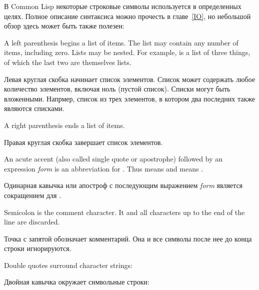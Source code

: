 В Common Lisp некоторые строковые символы используется в определенных целях. Полное
описание синтаксиса можно прочесть в главе~\ref{IO}, но небольшой обзор здесь
может быть также полезен:
\begin{indentdesc}{1.2pc}
\item[\cd{(}]
A left parenthesis begins a list of items.  The list may
contain any number of items, including zero.  Lists may be nested.
For example,  is a list of three things,
of which the last two are themselves lists.

\item[\cd{(}]
Левая круглая скобка начинает список элементов. Список может содержать любое
количество элементов, включая ноль (пустой список). Списки могут быть
вложенными. Напрмер,  список из трех элементов, в
котором два последних также являются списками.

\item[\cd{)}] A right parenthesis ends a list of items.

\item[\cd{)}] Правая круглая скобка завершает список элементов.

\item[\cd{\Xquote}] An acute accent (also called single
quote or apostrophe) followed by an expression {\it form}
is an abbreviation for .  Thus  means
 and  means .

\item[\cd{\Xquote}] Одинарная кавычка или апостроф с последующим выражением {\it
form} является сокращением для . 

\item[\cd{;}] Semicolon is the comment character.  It and all
characters up to the end of the line are discarded.

\item[\cd{;}] Точка с запятой обозначает комментарий. Она и все символы после
нее до конца строки игнорируются.

\item[\cd{"}] Double quotes surround character strings: \\

\item[\cd{"}] Двойная кавычка окружает символьные строки: \\


\end{indentdesc}
